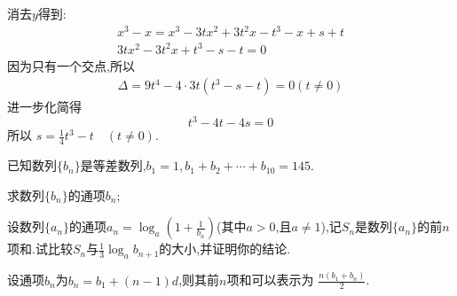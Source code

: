 \begin{questions}
\begin{penum}
\begin{solution}
\begin{penum}
				消去$y$得到:
				\begin{align*}
					x^3 - x = x^3 - 3tx^2 + 3t^2x - t^3 - x + s + t \\
					3tx^2 - 3t^2x + t^3 - s - t = 0
				\end{align*}
				因为只有一个交点,所以
				\begin{align*}
					\Delta = 9t^4 - 4\cdot 3t(t^3 - s - t) = 0 (t\neq0)
				\end{align*}
				进一步化简得
				\begin{equation*}
					t^3 - 4t - 4s = 0
				\end{equation*}
				所以
				$s=\frac14t^3 - t\quad (t\neq0)$.
			\end{penum}
		\end{solution}
	\end{penum}
	\question 已知数列$\{b_n\}$是等差数列,$b_1=1, b_1+b_2+\cdots+b_{10}=145$.
	\begin{penum}
		\item 求数列$\{b_n\}$的通项$b_n$;
		\item 设数列$\{a_n\}$的通项$a_n = \log_a \left( 1 + \frac{1}{b_n}
			\right)$(其中$a>0$,且$a\neq1$),记$S_n$是数列$\{a_n\}$的前$n$项和.试比较$S_n$与$\frac13\log_ab_{n+1}$的大小,并证明你的结论.
	\end{penum}

	\begin{solution}
		\begin{penum}
			\item 设通项$b_n$为$b_n = b_1 + (n-1)d$,则其前$n$项和可以表示为
			\begin{math}
				\frac{n(b_1 + b_n)}{2}
			\end{math}.


\end{penum}
\end{solution}
\end{questions}
